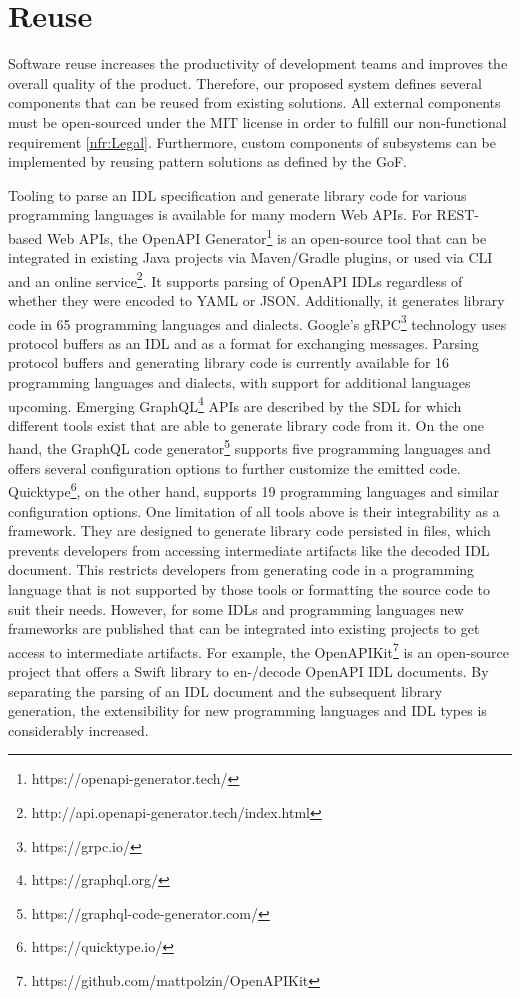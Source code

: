 \section{Reuse}
\label{sec:Reuse}

 Software reuse increases the productivity of development teams and improves the overall quality of the product. Therefore, our proposed system defines several components that can be reused from existing solutions. All external components must be open-sourced under the MIT license in order to fulfill our non-functional requirement \ref{nfr:Legal}. Furthermore, custom components of subsystems can be implemented by reusing pattern solutions as defined by the \ac{GoF}. 
 
 Tooling to parse an IDL specification and generate library code for various programming languages is available for many modern Web APIs. For REST-based Web APIs, the OpenAPI Generator\footnote{https://openapi-generator.tech/} is an open-source tool that can be integrated in existing Java projects via Maven/Gradle plugins, or used via CLI and an online service\footnote{http://api.openapi-generator.tech/index.html}. It supports parsing of OpenAPI IDLs regardless of whether they were encoded to YAML or JSON. Additionally, it generates library code in 65 programming languages and dialects. Google's gRPC\footnote{https://grpc.io/} technology uses protocol buffers as an IDL and as a format for exchanging messages. Parsing protocol buffers and generating library code is currently available for 16 programming languages and dialects, with support for additional languages upcoming. Emerging GraphQL\footnote{https://graphql.org/} APIs are described by the \ac{SDL} for which different tools exist that are able to generate library code from it. On the one hand, the GraphQL code generator\footnote{https://graphql-code-generator.com/} supports five programming languages and offers several configuration options to further customize the emitted code. Quicktype\footnote{https://quicktype.io/}, on the other hand, supports 19 programming languages and similar configuration options. One limitation of all tools above is their integrability as a framework. They are designed to generate library code persisted in files, which prevents developers from accessing intermediate artifacts like the decoded IDL document. This restricts developers from generating code in a programming language that is not supported by those tools or formatting the source code to suit their needs. However, for some IDLs and programming languages new frameworks are published that can be integrated into existing projects to get access to intermediate artifacts. For example, the OpenAPIKit\footnote{https://github.com/mattpolzin/OpenAPIKit} is an open-source project that offers a Swift library to en-/decode OpenAPI IDL documents. By separating the parsing of an IDL document and the subsequent library generation, the extensibility for new programming languages and IDL types is considerably increased. 
 
